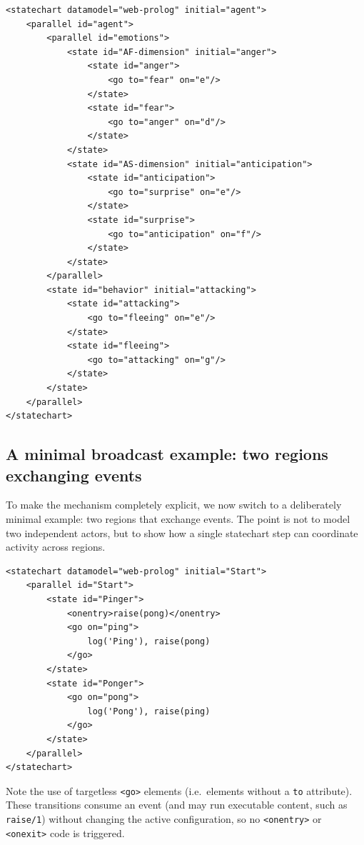 \begin{verbatim}
<statechart datamodel="web-prolog" initial="agent">
    <parallel id="agent">
        <parallel id="emotions">
            <state id="AF-dimension" initial="anger">
                <state id="anger">
                    <go to="fear" on="e"/>
                </state>
                <state id="fear">
                    <go to="anger" on="d"/>
                </state>
            </state>
            <state id="AS-dimension" initial="anticipation">
                <state id="anticipation">
                    <go to="surprise" on="e"/>
                </state>
                <state id="surprise">
                    <go to="anticipation" on="f"/>
                </state>
            </state>
        </parallel>
        <state id="behavior" initial="attacking">
            <state id="attacking">
                <go to="fleeing" on="e"/>
            </state>
            <state id="fleeing">
                <go to="attacking" on="g"/>
            </state>
        </state>
    </parallel>
</statechart>
\end{verbatim}

\subsection{A minimal broadcast example: two regions exchanging events}

To make the mechanism completely explicit, we now switch to a deliberately minimal example: two regions that exchange events. The point is not to model two independent actors, but to show how a single statechart step can coordinate activity across regions.

\begin{verbatim}
<statechart datamodel="web-prolog" initial="Start">
    <parallel id="Start">
        <state id="Pinger">
            <onentry>raise(pong)</onentry>
            <go on="ping">
                log('Ping'), raise(pong)
            </go>
        </state>
        <state id="Ponger">
            <go on="pong">
                log('Pong'), raise(ping)
            </go>
        </state>
    </parallel>
</statechart>
\end{verbatim}

\noindent Note the use of targetless \texttt{<go>} elements (i.e.\ elements without a \texttt{to} attribute). These transitions consume an event (and may run executable content, such as \texttt{raise/1}) without changing the active configuration, so no \texttt{<onentry>} or \texttt{<onexit>} code is triggered.

